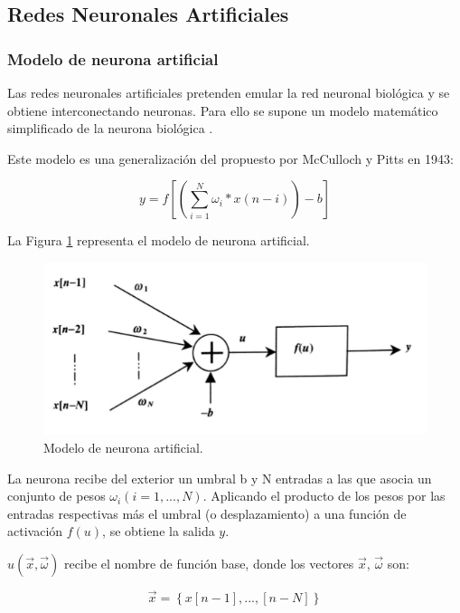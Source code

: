 \subsection{Redes Neuronales Artificiales}

		\subsubsection{Modelo de neurona artificial}

		Las redes neuronales artificiales pretenden emular la red neuronal biológica y se obtiene interconectando neuronas. Para ello se supone un modelo matemático simplificado de la neurona biológica \cite{Faundez2001}.
		
		Este modelo es una generalización del propuesto por McCulloch y Pitts en 1943:

		\begin{equation}\label{eq:ej}
			y = f \left[ \left( \sum_{i=1}^{N}\omega_i*x\left(n-i\right)\right)-b	\right]
		\end{equation}		

		La Figura \ref{fig:neuronaModel} representa el modelo de neurona artificial.

		\begin{figure}[H]
			\centering
			\includegraphics[width=0.6\linewidth]{figures/neuronaA}
			\caption{Modelo de neurona artificial.}
			\label{fig:neuronaModel}
		\end{figure}		

		La neurona recibe del exterior un umbral b y N entradas a las que asocia un conjunto de pesos $\omega_i(i=1,..., N)$. Aplicando el producto de los pesos por las entradas respectivas más el umbral (o desplazamiento) a una función de activación $f(u)$, se obtiene la salida $y$\cite{Faundez2001}.

		$u(\vec{x},\vec{\omega})$ recibe el nombre de función base, donde los vectores $\vec{x}$, $\vec{\omega}$ son:

		\begin{equation}\label{eq:ej}
			\vec{x}=\left\{ x\left[n-1\right],..., \left[n-N\right]	\right\}
		\end{equation}		


